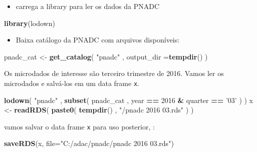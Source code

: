 \documentclass[]{book}
\newenvironment{Shaded}{\begin{snugshade}}{\end{snugshade}}
\newcommand{\KeywordTok}[1]{\textcolor[rgb]{0.13,0.29,0.53}{\textbf{#1}}}
\newcommand{\DataTypeTok}[1]{\textcolor[rgb]{0.13,0.29,0.53}{#1}}
\newcommand{\DecValTok}[1]{\textcolor[rgb]{0.00,0.00,0.81}{#1}}
\newcommand{\StringTok}[1]{\textcolor[rgb]{0.31,0.60,0.02}{#1}}
\newcommand{\OperatorTok}[1]{\textcolor[rgb]{0.81,0.36,0.00}{\textbf{#1}}}
\newcommand{\NormalTok}[1]{#1}
\providecommand{\tightlist}{%
  \setlength{\itemsep}{0pt}\setlength{\parskip}{0pt}}
\theoremstyle{definition}
\theoremstyle{definition}
\theoremstyle{definition}
\theoremstyle{remark}
\begin{document}
\begin{itemize}
\tightlist
\item
  carrega a library para ler os dados da PNADC
\end{itemize}

\begin{Shaded}
\begin{Highlighting}[]
\KeywordTok{library}\NormalTok{(lodown)}
\end{Highlighting}
\end{Shaded}

\begin{itemize}
\tightlist
\item
  Baixa catálogo da PNADC com arquivos disponíveis:
\end{itemize}

\begin{Shaded}
\begin{Highlighting}[]
\NormalTok{pnadc_cat <-}\StringTok{ }\KeywordTok{get_catalog}\NormalTok{( }\StringTok{"pnadc"}\NormalTok{ , }\DataTypeTok{output_dir =}\KeywordTok{tempdir}\NormalTok{() )}
\end{Highlighting}
\end{Shaded}

Os microdados de interesse são terceiro trimestre de 2016. Vamos ler os
microdados e salvá-los em um data frame \texttt{x}.

\begin{Shaded}
\begin{Highlighting}[]
\KeywordTok{lodown}\NormalTok{( }\StringTok{"pnadc"}\NormalTok{ , }\KeywordTok{subset}\NormalTok{( pnadc_cat , year }\OperatorTok{==}\StringTok{ }\DecValTok{2016} \OperatorTok{&}\StringTok{ }\NormalTok{quarter }\OperatorTok{==}\StringTok{ '03'}\NormalTok{ ) )}
\NormalTok{x <-}\StringTok{ }\KeywordTok{readRDS}\NormalTok{( }\KeywordTok{paste0}\NormalTok{( }\KeywordTok{tempdir}\NormalTok{() , }\StringTok{"/pnadc 2016 03.rds"}\NormalTok{ ) )}
\end{Highlighting}
\end{Shaded}

vamos salvar o data frame \texttt{x} para uso posterior, :

\begin{Shaded}
\begin{Highlighting}[]
\KeywordTok{saveRDS}\NormalTok{(x, }\DataTypeTok{file=}\StringTok{"C:/adac/pnadc/pnadc 2016 03.rds"}\NormalTok{)}
\end{Highlighting}
\end{Shaded}
\end{document}
